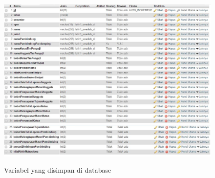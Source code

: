 \documentclass[a4paper,twoside]{article}
\begin{document}
\begin{enumerate}
			\begin{figure}[H]
				\centering
				\includegraphics[scale=0.75]{Gambar/database1}
				\includegraphics[scale=0.75]{Gambar/database2}
				\caption{Variabel yang disimpan di database}
				\label{fig:database}
			\end{figure}
		

\end{enumerate}
\end{document}
